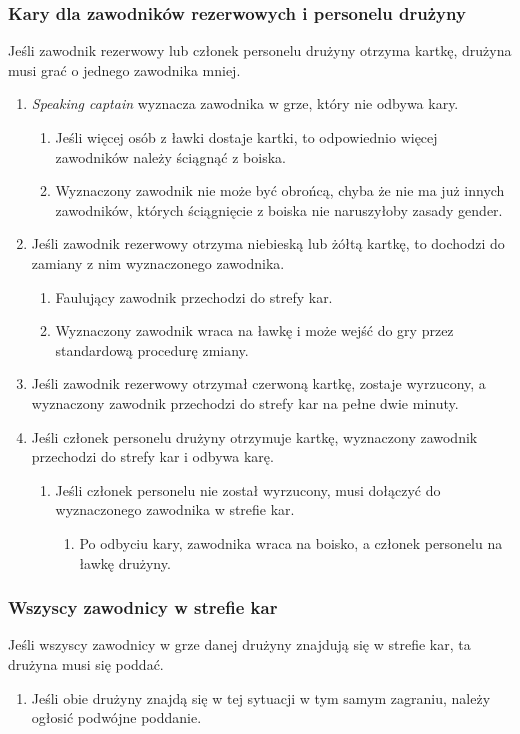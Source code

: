 \documentclass[11pt,a4paper]{article}
\begin{document}
\subsubsection{Kary dla zawodników rezerwowych i personelu drużyny}
Jeśli zawodnik rezerwowy lub członek personelu drużyny otrzyma kartkę, drużyna musi grać o jednego zawodnika mniej.
\begin{enumerate}
  \item \emph{Speaking captain} wyznacza zawodnika w grze, który nie odbywa kary.
  \begin{enumerate}
    \item Jeśli więcej osób z ławki dostaje kartki, to odpowiednio więcej zawodników należy ściągnąć z boiska.
    \item Wyznaczony zawodnik nie może być obrońcą, chyba że nie ma już innych zawodników, których ściągnięcie z boiska nie naruszyłoby zasady gender. %
  \end{enumerate}
  \item Jeśli zawodnik rezerwowy otrzyma niebieską lub żółtą kartkę, to dochodzi do zamiany z nim wyznaczonego zawodnika.
  \begin{enumerate}
    \item Faulujący zawodnik przechodzi do strefy kar.
    \item Wyznaczony zawodnik wraca na ławkę i może wejść do gry przez standardową procedurę zmiany.
  \end{enumerate}
  \item Jeśli zawodnik rezerwowy otrzymał czerwoną kartkę, zostaje wyrzucony, a wyznaczony zawodnik przechodzi do strefy kar na pełne dwie minuty.
  \item Jeśli członek personelu drużyny otrzymuje kartkę, wyznaczony zawodnik przechodzi do strefy kar i odbywa karę.
  \begin{enumerate}
    \item Jeśli członek personelu nie został wyrzucony, musi dołączyć do wyznaczonego zawodnika w strefie kar.
    \begin{enumerate}
      \item Po odbyciu kary, zawodnika wraca na boisko, a członek personelu na ławkę drużyny.
    \end{enumerate}
  \end{enumerate}
\end{enumerate}

\subsubsection{Wszyscy zawodnicy w strefie kar}
Jeśli wszyscy zawodnicy w grze danej drużyny znajdują się w strefie kar, ta drużyna musi się poddać.
\begin{enumerate}
  \item Jeśli obie drużyny znajdą się w tej sytuacji w tym samym zagraniu, należy ogłosić podwójne poddanie.
\end{enumerate}
\end{document}
